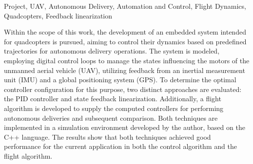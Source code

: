 \documentclass[repeatfields,xlists,xpacks,oneside,yearsonly]{ufrgscca}
\begin{document}
\begin{abstract}

No âmbito deste trabalho, busca-se o desenvolvimento de um sistema embarcado destinado a quadricópteros, visando controlar sua dinâmica com base em trajetórias predefinidas para operações autônomas de entrega. O sistema é modelado, empregando-se malhas de controle digital para gerenciar os estados que influenciam os motores da aeronave não tripulada (UAV, \textit{unmanned aerial vehicle}), utilizando o \textit{feedback} proveniente de uma unidade de medição inercial (IMU, \textit{inertial measurement unit}), um sistema de posicionamento global (GPS, \textit{global positioning system}) e demais sensores. Para determinar a configuração ideal do controlador para essa finalidade, são avaliadas duas abordagens distintas, o controlador PID e a linearização via realimentação de estados. Também é desenvolvido um algoritmo de voo que alimenta os controladores calculados para realização de entregas autônomas e posterior comparação. Ambas as técnicas são implementadas em um ambiente de simulação desenvolvido pelo autor, baseado na linguagem C++. Os resultados mostram que ambas as técnicas obtiveram bom comportamento para a aplicação vigente tanto para o algoritmo de controle quanto para o algoritmo de voo.

\end{abstract}
\begin{otherabstract}{Project, UAV, Autonomous Delivery, Automation and Control, Flight Dynamics, Quadcopters, Feedback linearization}

Within the scope of this work, the development of an embedded system intended for quadcopters is pursued, aiming to control their dynamics based on predefined trajectories for autonomous delivery operations. The system is modeled, employing digital control loops to manage the states influencing the motors of the unmanned aerial vehicle (UAV), utilizing feedback from an inertial measurement unit (IMU) and a global positioning system (GPS). To determine the optimal controller configuration for this purpose, two distinct approaches are evaluated: the PID controller and state feedback linearization. Additionally, a flight algorithm is developed to supply the computed controllers for performing autonomous deliveries and subsequent comparison. Both techniques are implemented in a simulation environment developed by the author, based on the C++ language. The results show that both techniques achieved good performance for the current application in both the control algorithm and the flight algorithm.
\end{otherabstract}
\end{document}
